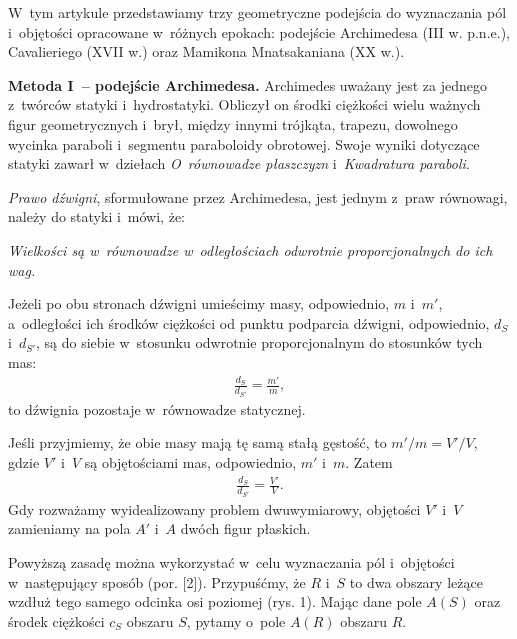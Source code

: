 W~tym artykule przedstawiamy trzy geometryczne  podejścia do wyznaczania pól i~objętości opracowane w~różnych epokach: podejście Archimedesa (III w. p.n.e.), Cavalieriego (XVII w.) oraz Mamikona Mnatsakaniana (XX w.).

{\bf \color{magenta}Metoda I~– podejście Archimedesa.}
Archimedes uważany jest za jednego z~twórców statyki i~hydrostatyki. Obliczył on środki ciężkości wielu ważnych figur geometrycznych i~brył, między innymi trójkąta, trapezu, dowolnego wycinka paraboli i~segmentu paraboloidy obrotowej.  
Swoje wyniki dotyczące statyki zawarł w~dziełach {\it O~równowadze płaszczyzn} i~{\it Kwadratura paraboli}. 

{\it Prawo dźwigni}, sformułowane przez Archimedesa, jest jednym z~praw równowagi, należy do statyki i~mówi, że:  

{\it Wielkości są w~równowadze w~odległościach odwrotnie proporcjonalnych do ich wag.}

Jeżeli po obu stronach dźwigni umieścimy masy, odpowiednio, $m$ i~$m'$, a~odległości ich środków ciężkości od punktu podparcia dźwigni, odpowiednio, $d_S$ i~$d_{S'}$, są do siebie w~stosunku odwrotnie proporcjonalnym do stosunków tych mas:
\begin{eqnarray}
\frac{d_S}{d_{S'}}=\frac{m'}{m},
\end{eqnarray}
to dźwignia pozostaje w~równowadze statycznej.

Jeśli przyjmiemy, że obie masy mają tę samą stałą gęstość, to $m'/m=V'/V$, gdzie $V'$ i~$V$ są objętościami mas, odpowiednio, $m'$ i~$m$. 
Zatem 
\begin{eqnarray}
\frac{d_S}{d_{S'}}=\frac{V'}{V}.
\end{eqnarray}
Gdy rozważamy  wyidealizowany problem dwuwymiarowy, objętości $V'$ i~$V$ zamieniamy na pola $A'$ i~$A$ dwóch figur płaskich. 

Powyższą zasadę można wykorzystać w~celu wyznaczania pól i~objętości
w~następujący sposób (por. [2]). Przypuśćmy, że $R$ i~$S$ to dwa
obszary leżące wzdłuż tego samego odcinka osi poziomej (rys. 1). Mając dane pole
$A(S)$ oraz środek ciężkości $c_S$ obszaru $S$, pytamy o~pole $A(R)$ obszaru $R$.

